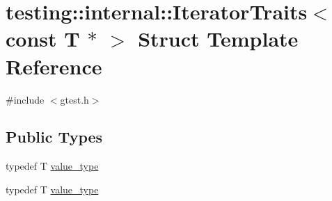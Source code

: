 \hypertarget{structtesting_1_1internal_1_1_iterator_traits_3_01const_01_t_01_5_01_4}{\section{testing\-:\-:internal\-:\-:Iterator\-Traits$<$ const T $\ast$ $>$ Struct Template Reference}
\label{structtesting_1_1internal_1_1_iterator_traits_3_01const_01_t_01_5_01_4}
}


{\ttfamily \#include $<$gtest.\-h$>$}

\subsection*{Public Types}
\begin{DoxyCompactItemize}
\item 
typedef T \hyperlink{structtesting_1_1internal_1_1_iterator_traits_3_01const_01_t_01_5_01_4_ae7c8867223e106f374b56a7dc4a85547}{value\-\_\-type}
\item 
typedef T \hyperlink{structtesting_1_1internal_1_1_iterator_traits_3_01const_01_t_01_5_01_4_ae7c8867223e106f374b56a7dc4a85547}{value\-\_\-type}
\end{DoxyCompactItemize}


